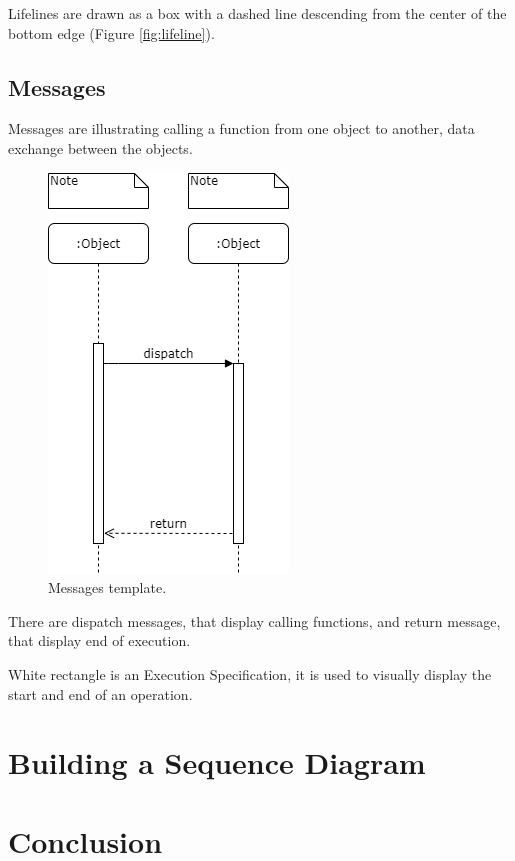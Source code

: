 \documentclass[10pt,slovak,a4paper]{article}
\begin{document}
Lifelines are drawn as a box with a dashed line descending from the center of the bottom edge (Figure \ref{fig:lifeline})\cite{IBM_SD}.


\subsection{Messages} \label{notation:messages}
Messages are illustrating calling a function from one object to another, data exchange between the objects.
\begin{figure}[tbh]
	\centering
	\includegraphics[scale=0.6]{Message.png}
	\caption{Messages template.}
	\label{fig:messages}
\end{figure}
There are dispatch messages, that display calling functions, and return message, that display end of execution\cite{UML}.

White rectangle is an Execution Specification, it is used to visually display the start and end of an operation.
\section{Building a Sequence Diagram} \label{building}





\section{Conclusion} \label{Conclusion} %







\end{document}
